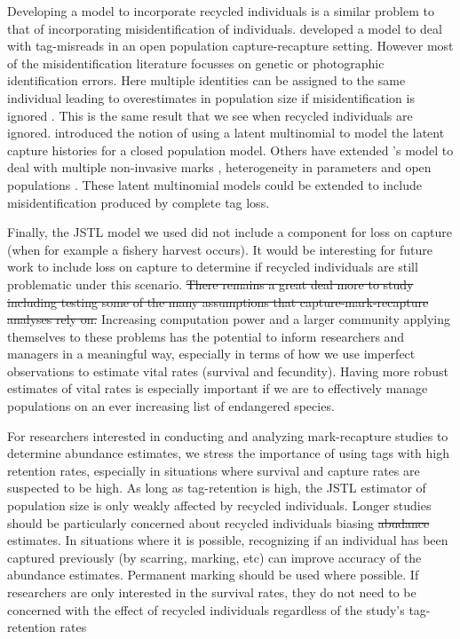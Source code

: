\documentclass[12pt]{article}
\providecommand{\DIFaddtex}[1]{{\protect\color{blue}\uwave{#1}}} %
\providecommand{\DIFdeltex}[1]{{\protect\color{red}\sout{#1}}}                      %
\providecommand{\DIFaddbegin}{} %
\providecommand{\DIFaddend}{} %
\providecommand{\DIFdelbegin}{} %
\providecommand{\DIFdelend}{} %
\providecommand{\DIFadd}[1]{\texorpdfstring{\DIFaddtex{#1}}{#1}} %
\providecommand{\DIFdel}[1]{\texorpdfstring{\DIFdeltex{#1}}{}} %
\newcommand{\DIFscaledelfig}{0.5}
\newlength{\DIFdelgraphicswidth} %
\newlength{\DIFdelgraphicsheight} %
\newcommand{\DIFaddincludegraphics}[2][]{{\color{blue}\fbox{\DIFOincludegraphics[#1]{#2}}}} %
\newcommand{\DIFdelincludegraphics}[2][]{%
\sbox{\DIFdelgraphicsbox}{\DIFOincludegraphics[#1]{#2}}%
\settoboxwidth{\DIFdelgraphicswidth}{\DIFdelgraphicsbox} %
\settoboxtotalheight{\DIFdelgraphicsheight}{\DIFdelgraphicsbox} %
\scalebox{\DIFscaledelfig}{%
\parbox[b]{\DIFdelgraphicswidth}{\usebox{\DIFdelgraphicsbox}\\[-\baselineskip] \rule{\DIFdelgraphicswidth}{0em}}\llap{\resizebox{\DIFdelgraphicswidth}{\DIFdelgraphicsheight}{%
\setlength{\unitlength}{\DIFdelgraphicswidth}%
\begin{picture}(1,1)%
\thicklines\linethickness{2pt} %
{\color[rgb]{1,0,0}\put(0,0){\framebox(1,1){}}}%
{\color[rgb]{1,0,0}\put(0,0){\line( 1,1){1}}}%
{\color[rgb]{1,0,0}\put(0,1){\line(1,-1){1}}}%
\end{picture}%
}\hspace*{3pt}}} %
} %
\DeclareRobustCommand{\DIFaddbegin}{\DIFOaddbegin \let\includegraphics\DIFaddincludegraphics} %
\DeclareRobustCommand{\DIFaddend}{\DIFOaddend \let\includegraphics\DIFOincludegraphics} %
\DeclareRobustCommand{\DIFdelbegin}{\DIFOdelbegin \let\includegraphics\DIFdelincludegraphics} %
\DeclareRobustCommand{\DIFdelend}{\DIFOaddend \let\includegraphics\DIFOincludegraphics} %
\begin{document}
Developing a model to incorporate recycled individuals is a similar problem to that of incorporating misidentification of individuals.  \cite{Schwarz:1999} developed a model to deal with tag-misreads in an open population capture-recapture setting.  However most of the misidentification literature focusses on genetic or photographic identification errors.  Here multiple identities can be assigned to the same individual leading to overestimates in population size if misidentification is ignored \citep{Yoshizaki:2011}. This is the same result that we see when recycled individuals are ignored.   \cite{Link:2010} introduced the notion of using a latent multinomial to model the latent capture histories for a closed population model. Others have extended \citeauthor{Link:2010}'s model to deal with multiple non-invasive marks \citep{Bonner:2013, McClintock:2013}, heterogeneity in parameters \citep{Mcclintock:2014} and open populations \citep{Bonner:2013}.  These latent multinomial models could be extended to include misidentification produced by complete tag loss.

Finally, the JSTL model we used did not include a component for loss on capture (when for example a fishery harvest occurs).  It would be interesting for future work to include loss on capture to determine if recycled individuals are still problematic under this scenario.   \DIFdelbegin \DIFdel{There remains a great deal more to study including testing some of the many assumptions that capture-mark-recapture analyses rely on.  }\DIFdelend Increasing computation power and a larger community applying themselves to these problems has the potential to inform researchers and managers in a meaningful way, especially in terms of how we use imperfect observations to estimate vital rates (survival and fecundity). Having more robust estimates of vital rates is especially important if we are to effectively manage populations on an ever increasing list of endangered species.

For researchers interested in conducting and analyzing mark-recapture
studies to determine abundance estimates, we stress the importance of using tags with high retention
rates, especially in situations where survival and capture rates are
suspected to be high. As long as tag-retention is high, the JSTL
estimator of population size is only weakly affected by recycled individuals. Longer studies should be particularly concerned about recycled individuals biasing \DIFdelbegin \DIFdel{abudance }\DIFdelend \DIFaddbegin \DIFadd{abundance }\DIFaddend estimates.  In
situations where it is possible, recognizing if an individual has been
captured previously (by scarring, marking, etc) can improve accuracy of the
abundance estimates. Permanent marking should be used where possible. If
researchers are only interested in the survival rates, they do not need
to be concerned with the effect of recycled individuals regardless of
the study's tag-retention rates\DIFaddbegin \DIFadd{.
}
\end{document}
